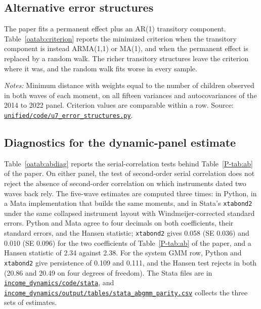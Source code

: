 \documentclass[11pt]{article}
\numberwithin{equation}{section}
\newcommand{\repourl}{https://github.com/JiachenJin1001/family-background-earnings-china}
\newcommand{\code}[1]{\href{\repourl/blob/main/#1}{\nolinkurl{#1}}}
\newcommand{\folder}[1]{\href{\repourl/tree/main/#1}{\nolinkurl{#1}}}
\begin{document}
\subsection{Alternative error structures}
\label{oa:errorstructures}

The paper fits a permanent effect plus an AR(1) transitory component.
Table~\ref{oatab:criterion} reports the minimized criterion when the
transitory component is instead ARMA(1,1) or MA(1), and when the
permanent effect is replaced by a random walk. The richer transitory
structures leave the criterion where it was, and the random walk fits
worse in every sample.

\begin{table}[H]
\centering
\small
\caption{Minimized criterion under alternative error structures.}
\label{oatab:criterion}
{\setlength{\tabcolsep}{4pt}}
\par\smallskip
\begin{minipage}{0.92\textwidth}
\footnotesize\emph{Notes:} Minimum distance with weights equal to the number of children observed in both waves of each moment, on all fifteen variances and
autocovariances of the 2014 to 2022 panel. Criterion values are
comparable within a row. Source:
\code{unified/code/u7_error_structures.py}.
\end{minipage}
\end{table}

\subsection{Diagnostics for the dynamic-panel estimate}

Table~\ref{oatab:abdiag} reports the serial-correlation tests behind
Table~\ref{P-tab:ab} of the paper. On either panel, the test of second-order serial correlation does not reject the absence of second-order correlation on which instruments dated two waves back rely. The five-wave estimates are computed three times: in Python, in a Mata implementation that builds the same moments, and in Stata's \texttt{xtabond2} under the same collapsed instrument layout with Windmeijer-corrected standard errors. Python and Mata agree to four decimals on both coefficients, their standard errors, and the Hansen statistic; \texttt{xtabond2} gives 0.058 (SE 0.036) and 0.010 (SE 0.096) for the two coefficients of Table~\ref{P-tab:ab} of the paper, and a Hansen statistic of 2.34 against 2.38. For the system GMM row, Python and \texttt{xtabond2} give persistence of 0.109 and 0.111, and the Hansen test rejects in both (20.86 and 20.49 on four degrees of freedom). The Stata files are in \folder{income_dynamics/code/stata}, and \code{income_dynamics/output/tables/stata_abgmm_parity.csv} collects the three sets of estimates.
\end{document}
